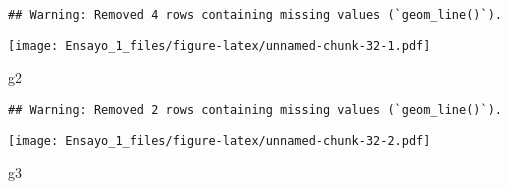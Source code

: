 \documentclass[
]{article}
\newenvironment{Shaded}{\begin{snugshade}}{\end{snugshade}}
\newcommand{\AttributeTok}[1]{\textcolor[rgb]{0.77,0.63,0.00}{#1}}
\newcommand{\FunctionTok}[1]{\textcolor[rgb]{0.00,0.00,0.00}{#1}}
\newcommand{\NormalTok}[1]{#1}
\newcommand{\OtherTok}[1]{\textcolor[rgb]{0.56,0.35,0.01}{#1}}
\newcommand{\SpecialCharTok}[1]{\textcolor[rgb]{0.00,0.00,0.00}{#1}}
\newcommand{\StringTok}[1]{\textcolor[rgb]{0.31,0.60,0.02}{#1}}
\begin{document}
\begin{Shaded}
\end{Shaded}

\begin{verbatim}
## Warning: Removed 4 rows containing missing values (`geom_line()`).
\end{verbatim}

\texttt{[image: Ensayo\_1\_files/figure-latex/unnamed-chunk-32-1.pdf]}

\begin{Shaded}
\begin{Highlighting}[]
\NormalTok{g2}
\end{Highlighting}
\end{Shaded}

\begin{verbatim}
## Warning: Removed 2 rows containing missing values (`geom_line()`).
\end{verbatim}

\texttt{[image: Ensayo\_1\_files/figure-latex/unnamed-chunk-32-2.pdf]}

\begin{Shaded}
\begin{Highlighting}[]
\NormalTok{g3}
\end{Highlighting}
\end{Shaded}
\end{document}
